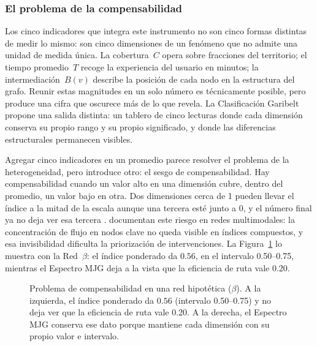 
\subsubsection{El problema de la compensabilidad}
\label{subsubsec:garibelt-compensabilidad}

Los cinco indicadores que integra este instrumento no son cinco formas distintas
de medir lo mismo: son cinco dimensiones de un fenómeno que no admite una unidad
de medida única. La cobertura~$C$ opera sobre fracciones del territorio; el
tiempo promedio~$T$ recoge la experiencia del usuario en minutos; la
intermediación~$B(v)$ describe la posición de cada nodo en la estructura del
grafo. Reunir estas magnitudes en un solo número es técnicamente posible, pero
produce una cifra que oscurece más de lo que revela. La Clasificación Garibelt
propone una salida distinta: un tablero de cinco lecturas donde cada dimensión
conserva su propio rango y su propio significado, y donde las diferencias
estructurales permanecen visibles.

Agregar cinco indicadores en un promedio parece resolver el problema de la
heterogeneidad, pero introduce otro: el sesgo de compensabilidad. Hay
compensabilidad cuando un valor alto en una dimensión cubre, dentro del
promedio, un valor bajo en otra. Dos dimensiones cerca de 1 pueden llevar el
índice a la mitad de la escala aunque una tercera esté junto a 0, y el número
final ya no deja ver esa tercera \citep{hossain2024}. \citet{deng2023}
documentan este riesgo en redes multimodales: la concentración de flujo en
nodos clave no queda visible en índices compuestos, y esa invisibilidad
dificulta la priorización de intervenciones. La
Figura~\ref{fig:compensabilidad-garibelt} lo muestra con la Red~$\beta$: el
índice ponderado da $0.56$, en el intervalo 0.50--0.75, mientras el Espectro
MJG deja a la vista que la eficiencia de ruta vale 0.20.

\begin{figure}[htbp]
\centering

\caption[Problema de compensabilidad en índices compuestos de transporte]{%
    Problema de compensabilidad en una red hipotética ($\beta$). A la
    izquierda, el índice ponderado da $0.56$ (intervalo 0.50--0.75) y no
    deja ver que la eficiencia de ruta vale 0.20. A la derecha, el Espectro
    MJG conserva ese dato porque mantiene cada dimensión con su propio valor
    e intervalo.}
\label{fig:compensabilidad-garibelt}
\end{figure}

